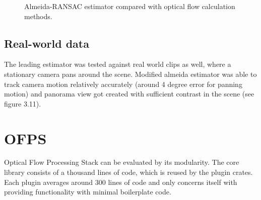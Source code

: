 \documentclass[11pt,english]{report}
\newcommand{\getstat}[1]{docs/statistics/#1}
\newcommand{\vidpic}[1]{
	\texttt{[image: docs/report/\#1]}
}
\newcommand{\statplot}[4]{
	\addplot[#3, mark = #4, thick, smooth, mark size = 2, mark options={fill=#3}] table [y=#2, col sep=comma] {\getstat{#1}};
}
\begin{document}
\begin{figure}[!ht]
\begin{center}
\end{center}
\caption{\centering Almeida-RANSAC estimator compared with optical flow calculation methods.}
\end{figure}

\subsection{Real-world data}

The leading estimator was tested against real world clips as well, where a stationary camera pans around the scene. Modified almeida estimator was able to track camera motion relatively accurately (around 4 degree error for panning motion) and panorama view got created with sufficient contrast in the scene (see figure 3.11).

\newpage

\section{OFPS}

Optical Flow Processing Stack can be evaluated by its modularity. The core library consists of a thousand lines of code, which is reused by the plugin crates. Each plugin averages around 300 lines of code and only concerns itself with providing functionality with minimal boilerplate code.
\end{document}
